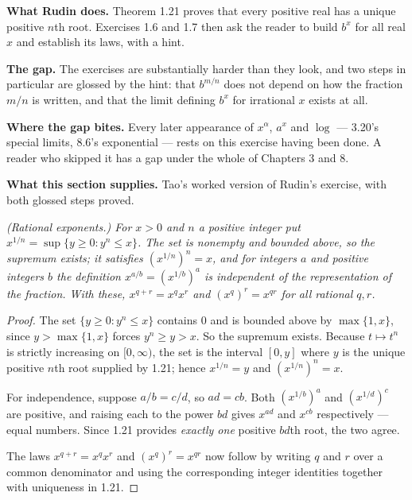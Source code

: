 \begin{roadmap}
\raggedright
\textbf{What Rudin does.} Theorem 1.21 proves that every positive real has a
unique positive $n$th root. Exercises 1.6 and 1.7 then ask the reader to
build $b^x$ for all real $x$ and establish its laws, with a hint.

\smallskip
\textbf{The gap.} The exercises are substantially harder than they look, and
two steps in particular are glossed by the hint: that $b^{m/n}$ does not
depend on how the fraction $m/n$ is written, and that the limit defining
$b^x$ for irrational $x$ exists at all.

\smallskip
\textbf{Where the gap bites.} Every later appearance of $x^\alpha$,
$a^x$ and $\log$ --- 3.20's special limits, 8.6's exponential --- rests on
this exercise having been done. A reader who skipped it has a gap under the
whole of Chapters 3 and 8.

\smallskip
\textbf{What this section supplies.} Tao's worked version of Rudin's
exercise, with both glossed steps proved.
\end{roadmap}

\emph{(Rational exponents.) For $x>0$ and $n$ a positive integer put
$x^{1/n} = \sup\{y \ge 0 : y^n \le x\}$. The set is nonempty and bounded
above, so the supremum exists; it satisfies $(x^{1/n})^n = x$, and for
integers $a$ and positive integers $b$ the definition
$x^{a/b} = (x^{1/b})^a$ is independent of the representation of the
fraction. With these, $x^{q+r} = x^qx^r$ and $(x^q)^r = x^{qr}$ for all
rational $q,r$.}
\begin{proof}
The set $\{y \ge 0 : y^n \le x\}$ contains $0$ and is bounded above by
$\max\{1,x\}$, since $y > \max\{1,x\}$ forces $y^n \ge y > x$. So the
supremum exists. Because $t \mapsto t^n$ is strictly increasing on
$[0,\infty)$, the set is the interval $[0,y]$ where $y$ is the unique
positive $n$th root supplied by 1.21; hence $x^{1/n}=y$ and
$(x^{1/n})^n = x$.

For independence, suppose $a/b = c/d$, so $ad = cb$. Both $(x^{1/b})^a$ and
$(x^{1/d})^c$ are positive, and raising each to the power $bd$ gives
$x^{ad}$ and $x^{cb}$ respectively --- equal numbers. Since 1.21 provides
\emph{exactly one} positive $bd$th root, the two agree.

The laws $x^{q+r}=x^qx^r$ and $(x^q)^r = x^{qr}$ now follow by writing $q$
and $r$ over a common denominator and using the corresponding integer
identities together with uniqueness in 1.21.
\end{proof}

